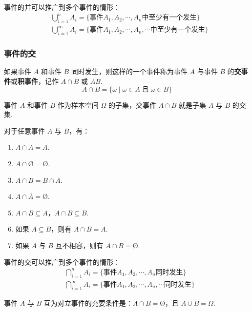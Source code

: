 事件的并可以推广到多个事件的情形：
$$
\begin{aligned}
    & \bigcup_{i=1}^n A_i = \{ \text{事件} A_1,A_2,\cdots,A_n \text{中至少有一个发生} \} \\
    & \bigcup_{i=1}^\infty A_i = \{ \text{事件} A_1,A_2,\cdots,A_n,\cdots \text{中至少有一个发生} \}
\end{aligned}
$$

\subsubsection{事件的交}

如果事件 $A$ 和事件 $B$ 同时发生，则这样的一个事件称为事件 $A$ 与事件 $B$ 的\textbf{交事件}或\textbf{积事件}，记作 $A \cap B$ 或 $AB$.
$$
A \cap B = \{ \omega \mid \omega \in A \;\text{且}\; \omega \in B \}
$$

事件 $A$ 和事件 $B$ 作为样本空间 $\varOmega$ 的子集，交事件 $A \cap B$ 就是子集 $A$ 与 $B$ 的交集.

\begin{property}
    \indent 对于任意事件 $A$ 与 $B$，有：
    \begin{enumerate}
        \item $A \cap A = A$.
        \item $A \cap \text{\O} = \text{\O}$.
        \item $A \cap B = B \cap A$.
        \item $A \cap \overline{A} = \text{\O}$.
        \item $A \cap B \subseteq A$，$A \cap B \subseteq B$.
        \item 如果 $A \subseteq B$，则有 $A \cap B = A$.
        \item 如果 $A$ 与 $B$ 互不相容，则有 $A \cap B = \text{\O}$.
    \end{enumerate}
\end{property}

事件的交可以推广到多个事件的情形：
$$
\begin{aligned}
    & \bigcap_{i=1}^n A_i = \{ \text{事件} A_1,A_2,\cdots,A_n \text{同时发生} \} \\
    & \bigcap_{i=1}^\infty A_i = \{ \text{事件} A_1,A_2,\cdots,A_n,\cdots \text{同时发生} \}
\end{aligned}
$$

\begin{conclusion}
    \indent 事件 $A$ 与 $B$ 互为对立事件的充要条件是：$A \cap B = \text{\O}$，且 $A \cup B = \varOmega$.
\end{conclusion}

